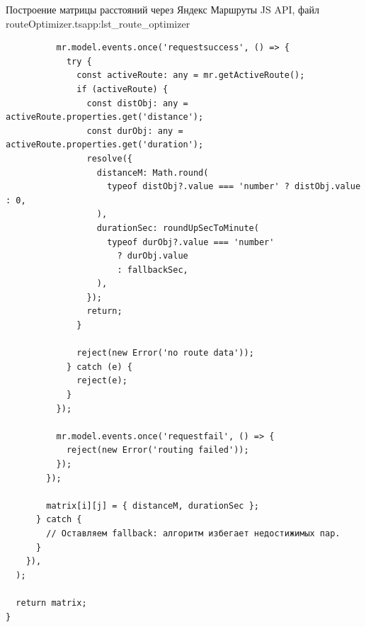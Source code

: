 \begin{codelisting}{Построение матрицы расстояний через Яндекс Маршруты JS API, файл routeOptimizer.ts}{app:lst_route_optimizer}
\begin{verbatim}
          mr.model.events.once('requestsuccess', () => {
            try {
              const activeRoute: any = mr.getActiveRoute();
              if (activeRoute) {
                const distObj: any = activeRoute.properties.get('distance');
                const durObj: any = activeRoute.properties.get('duration');
                resolve({
                  distanceM: Math.round(
                    typeof distObj?.value === 'number' ? distObj.value : 0,
                  ),
                  durationSec: roundUpSecToMinute(
                    typeof durObj?.value === 'number'
                      ? durObj.value
                      : fallbackSec,
                  ),
                });
                return;
              }

              reject(new Error('no route data'));
            } catch (e) {
              reject(e);
            }
          });

          mr.model.events.once('requestfail', () => {
            reject(new Error('routing failed'));
          });
        });

        matrix[i][j] = { distanceM, durationSec };
      } catch {
        // Оставляем fallback: алгоритм избегает недостижимых пар.
      }
    }),
  );

  return matrix;
}
  \end{verbatim}
\end{codelisting}
